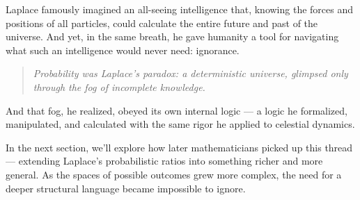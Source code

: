 Laplace famously imagined an all-seeing intelligence that, knowing the forces and positions of all particles, could calculate the entire future and past of the universe. And yet, in the same breath, he gave humanity a tool for navigating what such an intelligence would never need: ignorance.

\begin{quote}
    \textit{Probability was Laplace’s paradox: a deterministic universe, glimpsed only through the fog of incomplete knowledge.}
\end{quote}

And that fog, he realized, obeyed its own internal logic — a logic he formalized, manipulated, and calculated with the same rigor he applied to celestial dynamics.

\vspace{1em}
\noindent
In the next section, we’ll explore how later mathematicians picked up this thread — extending Laplace’s probabilistic ratios into something richer and more general. As the spaces of possible outcomes grew more complex, the need for a deeper structural language became impossible to ignore.

